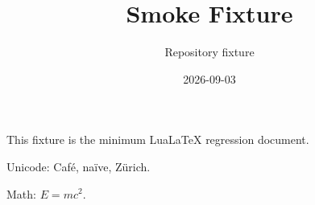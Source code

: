 \documentclass[11pt,a4paper]{article}
\title{Smoke Fixture}
\author{Repository fixture}
\date{2026-09-03}%
\begin{document}
\maketitle

This fixture is the minimum LuaLaTeX regression document.

Unicode: Café, naïve, Zürich.

Math: \(E = mc^{2}\).
\end{document}
